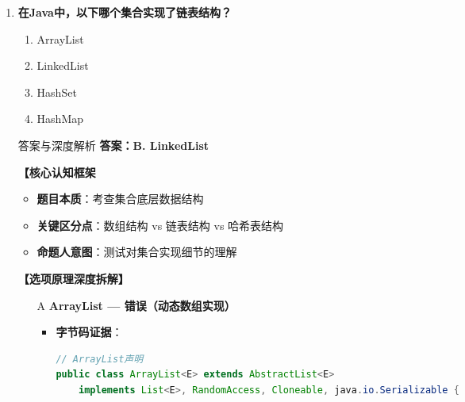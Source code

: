 \documentclass[12pt, a4paper]{ctexart}
\begin{document}
\begin{enumerate}[label=\textbf{\arabic*.}]
\begin{bluebox}{答案与深度解析}
		      \textbf{【应背诵知识点}
		      \begin{itemize}[label={}, nosep]
			      \item List：有序、允许重复、可通过索引访问
			      \item Set：无序、不允许重复、依赖equals()和hashCode()
			      \item Map：键值对存储、键唯一、值可重复
			      \item 选项辨析：List=有序重复，Set=无序唯一，Map=键值对
		      \end{itemize}

		      \textbf{【命题趋势与实战策略】}

		      \textbf{考场秒杀}：看到"允许重复"→必选List，"不允许重复"→必选Set
	      \end{bluebox}

	      \vspace{1em}

	\item \textbf{在Java中，以下哪个集合实现了链表结构？}
	      \begin{enumerate}[label=\Alph*.]
		      \item ArrayList
		      \item LinkedList
		      \item HashSet
		      \item HashMap
	      \end{enumerate}

	      \begin{bluebox}{答案与深度解析}
		      \textbf{答案：B. LinkedList}

		      \textbf{【核心认知框架}
		      \begin{itemize}[label={}, leftmargin=*, nosep]
			      \item \textbf{题目本质}：考查集合底层数据结构
			      \item \textbf{关键区分点}：数组结构 vs 链表结构 vs 哈希表结构
			      \item \textbf{命题人意图}：测试对集合实现细节的理解
		      \end{itemize}

		      \textbf{【选项原理深度拆解】}

		      \begin{itemize}[leftmargin=*, nosep, label={}]
			      \item[A] \textbf{ArrayList — 错误（动态数组实现）}
			            \begin{itemize}[label={}, leftmargin=*, nosep]
				            \item \textbf{字节码证据}：
				                  \begin{lstlisting}[language=Java]
// ArrayList声明
public class ArrayList<E> extends AbstractList<E>
    implements List<E>, RandomAccess, Cloneable, java.io.Serializable {


\end{lstlisting}
\end{itemize}
\end{itemize}
\end{bluebox}
\end{enumerate}
\end{document}
